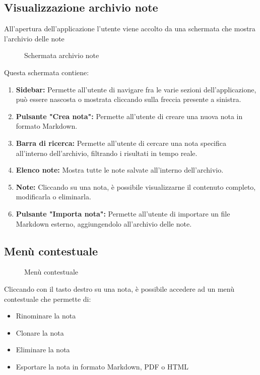 \documentclass[a4paper,10pt]{article}
\begin{document}
\subsection{Visualizzazione archivio note}
All'apertura dell'applicazione l'utente viene accolto da una schermata che mostra l'archivio delle note

\begin{center}
  \begin{figure}[H]
    \centering
    
    \caption{Schermata archivio note}
    \label{fig:archivio_note}
  \end{figure}
\end{center}

Questa schermata contiene:
\begin{enumerate}
  \item \textbf{Sidebar:} Permette all'utente di navigare fra le varie sezioni dell'applicazione, può essere nascosta o mostrata cliccando sulla freccia presente a sinistra.
  \item \textbf{Pulsante "Crea nota":} Permette all'utente di creare una nuova nota in formato Markdown.
  \item \textbf{Barra di ricerca:} Permette all'utente di cercare una nota specifica all'interno dell'archivio, filtrando i risultati in tempo reale.
  \item \textbf{Elenco note:} Mostra tutte le note salvate all'interno dell'archivio.
  \item \textbf{Note:} Cliccando su una nota, è possibile visualizzarne il contenuto completo, modificarla o eliminarla.
  \item \textbf{Pulsante "Importa nota":} Permette all'utente di importare un file Markdown esterno, aggiungendolo all'archivio delle note.
\end{enumerate}

\subsection{Menù contestuale}

\begin{center}
  \begin{figure}[H]
    \centering
    
    \caption{Menù contestuale}
    \label{fig:menù_contestuale}
  \end{figure}
\end{center}

Cliccando con il tasto destro su una nota, è possibile accedere ad un menù contestuale che permette di:
\begin{itemize}
    \item Rinominare la nota
    \item Clonare la nota
    \item Eliminare la nota
    \item Esportare la nota in formato Markdown, PDF o HTML
\end{itemize}
\end{document}
